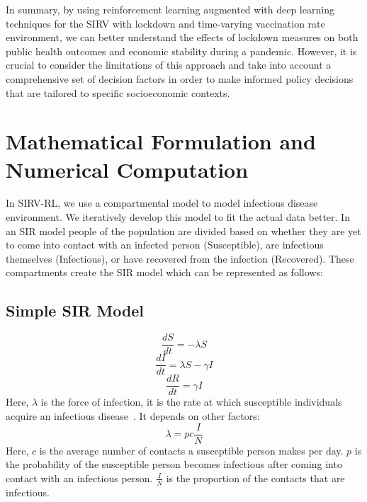 \documentclass[tikz,fleqn,12pt]{wlscirep}
\begin{document}
In summary, by using reinforcement learning augmented with deep learning techniques for the SIRV with lockdown and time-varying vaccination rate environment, we can better understand the effects of lockdown measures on both public health outcomes and economic stability during a pandemic. However, it is crucial to consider the limitations of this approach and take into account a comprehensive set of decision factors in order to make informed policy decisions that are tailored to specific socioeconomic contexts.

\section{Mathematical Formulation and Numerical Computation}
In SIRV-RL, we use a compartmental model to model infectious disease environment. We iteratively develop this model to fit the actual data better. In an SIR model people of the population are divided based on whether they are yet to come into contact with an infected person (Susceptible), are infectious themselves (Infectious), or have recovered from the infection (Recovered). These compartments create the SIR model which can be represented as follows:
\subsection{Simple SIR Model}
\begin{figure}[htbp!]
\centering    
{}
\end{figure}
\begin{equation}
  \frac{d S}{d t}=-\lambda S
  \label{eq:S_without_lockdown}
\end{equation}
\begin{equation}
  \frac{d I}{d t}=\lambda S-\gamma I
  \label{eq:I_without_lockdown}
\end{equation}
\begin{equation}
  \frac{d R}{d t}=\gamma I
  \label{eq:R_without_lockdown}
\end{equation}
Here, $\lambda$ is the force of infection, it is the rate at which susceptible individuals acquire an infectious disease~\cite{hens_aerts_faes_shkedy_lejeune_vandamme_beutels_2010}. It depends on other factors:
\begin{equation}
  \lambda = pc\frac{I}{N}
  \label{eq:lambda_force_of_infection}
\end{equation}
Here, $c$ is the average number of contacts a susceptible person makes per day. $p$ is the probability of the susceptible person becomes infectious after coming into contact with an infectious person. $\frac{I}{N}$ is the proportion of the contacts that are infectious.
\end{document}
